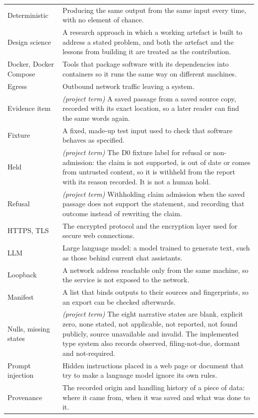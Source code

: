 \begin{longtable}{P{0.20\textwidth}P{0.72\textwidth}}
Deterministic & Producing the same output from the same input every time, with no element of chance. \\
Design science & A research approach in which a working artefact is built to address a stated problem, and both the artefact and the lessons from building it are treated as the contribution. \\
Docker, Docker Compose & Tools that package software with its dependencies into containers so it runs the same way on different machines. \\
Egress & Outbound network traffic leaving a system. \\
Evidence item & \textit{(project term)} A saved passage from a saved source copy, recorded with its exact location, so a later reader can find the same words again. \\
Fixture & A fixed, made-up test input used to check that software behaves as specified. \\
Held & \textit{(project term)} The D0 fixture label for refusal or non-admission: the claim is not supported, is out of date or comes from untrusted content, so it is withheld from the report with its reason recorded. It is not a human hold. \\
Refusal & \textit{(project term)} Withholding claim admission when the saved passage does not support the statement, and recording that outcome instead of rewriting the claim. \\
HTTPS, TLS & The encrypted protocol and the encryption layer used for secure web connections. \\
LLM & Large language model: a model trained to generate text, such as those behind current chat assistants. \\
Loopback & A network address reachable only from the same machine, so the service is not exposed to the network. \\
Manifest & A list that binds outputs to their sources and fingerprints, so an export can be checked afterwards. \\
Nulls, missing states & \textit{(project term)} The eight narrative states are blank, explicit zero, none stated, not applicable, not reported, not found publicly, source unavailable and invalid. The implemented type system also records observed, filing-not-due, dormant and not-required. \\
Prompt injection & Hidden instructions placed in a web page or document that try to make a language model ignore its own rules. \\
Provenance & The recorded origin and handling history of a piece of data: where it came from, when it was saved and what was done to it. \\

\end{longtable}
